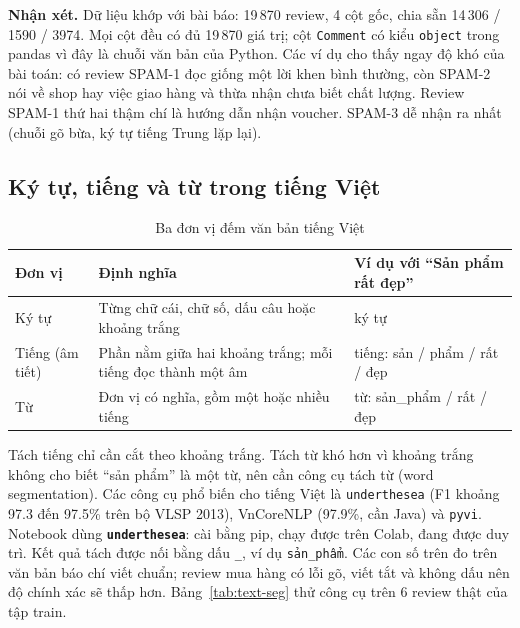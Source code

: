 \textbf{Nhận xét.} Dữ liệu khớp với bài báo: 19\,870 review, 4 cột gốc, chia sẵn 14\,306 / 1590 / 3974. Mọi cột đều có đủ
19\,870 giá trị; cột \texttt{Comment} có kiểu \texttt{object} trong pandas vì đây là chuỗi văn bản của Python.
Các ví dụ cho thấy ngay độ khó của bài toán: có review SPAM-1 đọc giống một lời khen bình thường, còn SPAM-2 nói về
shop hay việc giao hàng và thừa nhận chưa biết chất lượng. Review SPAM-1 thứ hai thậm chí là hướng dẫn nhận voucher.
SPAM-3 dễ nhận ra nhất (chuỗi gõ bừa, ký tự tiếng Trung lặp lại).

\subsection{Ký tự, tiếng và từ trong tiếng Việt}
\label{sec:text-units}

\begin{table}[H]
\centering
\caption{Ba đơn vị đếm văn bản tiếng Việt}
\label{tab:text-unit-def}
\begin{tabular}{>{\raggedright\arraybackslash}p{2.8cm}>{\raggedright\arraybackslash}p{6.4cm}>{\raggedright\arraybackslash}p{5.2cm}}
\toprule
Đơn vị & Định nghĩa & Ví dụ với ``Sản phẩm rất đẹp''\\
\midrule
Ký tự & Từng chữ cái, chữ số, dấu câu hoặc khoảng trắng & 16 ký tự\\
Tiếng (âm tiết) & Phần nằm giữa hai khoảng trắng; mỗi tiếng đọc thành một âm & 4 tiếng: sản / phẩm / rất / đẹp\\
Từ & Đơn vị có nghĩa, gồm một hoặc nhiều tiếng & 3 từ: sản\_phẩm / rất / đẹp\\
\bottomrule
\end{tabular}
\end{table}

Tách tiếng chỉ cần cắt theo khoảng trắng. Tách từ khó hơn vì khoảng trắng không cho biết ``sản phẩm'' là một từ, nên cần
công cụ tách từ (word segmentation). Các công cụ phổ biến cho tiếng Việt là \texttt{underthesea} (F1 khoảng 97.3 đến 97.5\%
trên bộ VLSP 2013), VnCoreNLP (97.9\%, cần Java) và \texttt{pyvi}. Notebook dùng \textbf{\texttt{underthesea}}: cài bằng pip,
chạy được trên Colab, đang được duy trì. Kết quả tách được nối bằng dấu \texttt{\_}, ví dụ \texttt{sản\_phẩm}. Các con số trên
đo trên văn bản báo chí viết chuẩn; review mua hàng có lỗi gõ, viết tắt và không dấu nên độ chính xác sẽ thấp hơn.
Bảng~\ref{tab:text-seg} thử công cụ trên 6 review thật của tập train.

